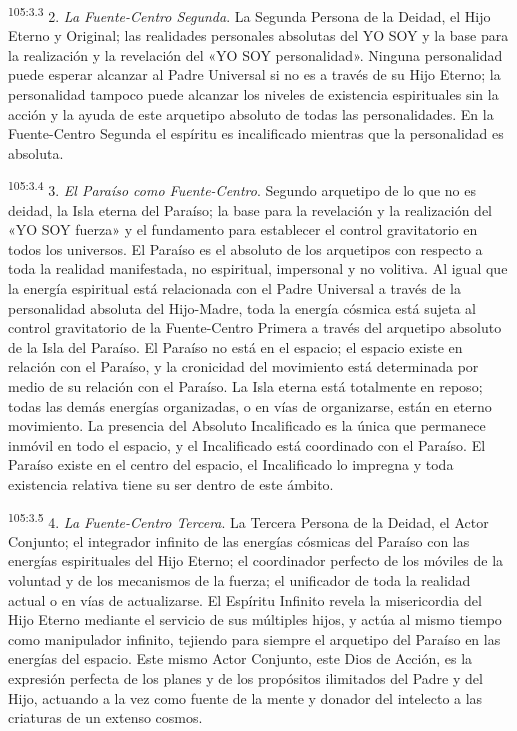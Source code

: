 \par
\textsuperscript{105:3.3} 2. \textit{La Fuente-Centro Segunda}. La Segunda Persona de la Deidad, el Hijo Eterno y Original; las realidades personales absolutas del YO SOY y la base para la realización y la revelación del «YO SOY personalidad». Ninguna personalidad puede esperar alcanzar al Padre Universal si no es a través de su Hijo Eterno; la personalidad tampoco puede alcanzar los niveles de existencia espirituales sin la acción y la ayuda de este arquetipo absoluto de todas las personalidades. En la Fuente-Centro Segunda el espíritu es incalificado mientras que la personalidad es absoluta.

\par
\textsuperscript{105:3.4} 3. \textit{El Paraíso como Fuente-Centro}. Segundo arquetipo de lo que no es deidad, la Isla eterna del Paraíso; la base para la revelación y la realización del «YO SOY fuerza» y el fundamento para establecer el control gravitatorio en todos los universos. El Paraíso es el absoluto de los arquetipos con respecto a toda la realidad manifestada, no espiritual, impersonal y no volitiva. Al igual que la energía espiritual está relacionada con el Padre Universal a través de la personalidad absoluta del Hijo-Madre, toda la energía cósmica está sujeta al control gravitatorio de la Fuente-Centro Primera a través del arquetipo absoluto de la Isla del Paraíso. El Paraíso no está en el espacio; el espacio existe en relación con el Paraíso, y la cronicidad del movimiento está determinada por medio de su relación con el Paraíso. La Isla eterna está totalmente en reposo; todas las demás energías organizadas, o en vías de organizarse, están en eterno movimiento. La presencia del Absoluto Incalificado es la única que permanece inmóvil en todo el espacio, y el Incalificado está coordinado con el Paraíso. El Paraíso existe en el centro del espacio, el Incalificado lo impregna y toda existencia relativa tiene su ser dentro de este ámbito.

\par
\textsuperscript{105:3.5} 4. \textit{La Fuente-Centro Tercera}. La Tercera Persona de la Deidad, el Actor Conjunto; el integrador infinito de las energías cósmicas del Paraíso con las energías espirituales del Hijo Eterno; el coordinador perfecto de los móviles de la voluntad y de los mecanismos de la fuerza; el unificador de toda la realidad actual o en vías de actualizarse. El Espíritu Infinito revela la misericordia del Hijo Eterno mediante el servicio de sus múltiples hijos, y actúa al mismo tiempo como manipulador infinito, tejiendo para siempre el arquetipo del Paraíso en las energías del espacio. Este mismo Actor Conjunto, este Dios de Acción, es la expresión perfecta de los planes y de los propósitos ilimitados del Padre y del Hijo, actuando a la vez como fuente de la mente y donador del intelecto a las criaturas de un extenso cosmos.

